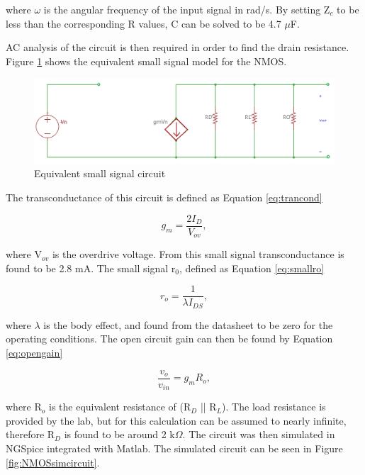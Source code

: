 	where $\omega$ is the angular frequency of the input signal in rad/s. By setting Z$_c$ to be less than the corresponding R values, C can be solved to be 4.7 $\mu$F.
	
	
	 AC analysis of the circuit is then required in order to find the drain resistance. Figure \ref{fig:smallsignalnmos} shows the equivalent small signal model for the NMOS.
	
	
	\begin{figure}[H]
		\centering
		\includegraphics[width=.55\textwidth]{CircuitDevelopment/smallsignal.png}
		\caption{Equivalent small signal circuit}
		\label{fig:smallsignalnmos}
	\end{figure}
	
	The transconductance of this circuit is defined as Equation \ref{eq:trancond}
	
	\begin{equation}\label{eq:trancond}
	g_m = \frac{2I_D}{V_{ov}},
	\end{equation}
	
	where V$_{ov}$ is the overdrive voltage. From this small signal transconductance is found to be 2.8 mA. The small signal r$_0$, defined as Equation \ref{eq:smallro}
	
	\begin{equation}\label{eq:smallro}
	
	r_o = \frac{1}{\lambda I_{DS}},
	
	\end{equation}
	
	where $\lambda$ is the body effect, and found from the datasheet \cite{NMOS} to be zero for the operating conditions. The open circuit gain can then be found by Equation \ref{eq:opengain} 
	
	\begin{equation}\label{eq:opengain}
	\frac{v_o}{v_{in}} = g_mR_o,
	\end{equation}
	
	where R$_o$ is the equivalent resistance of (R$_D$ || R$_L$). The load resistance is provided by the lab, but for this calculation can be assumed to nearly infinite, therefore R$_D$ is found to be around 2 k$\Omega$. The circuit was then simulated in NGSpice integrated with Matlab. The simulated circuit can be seen in Figure \ref{fig:NMOSsimcircuit}.
	
